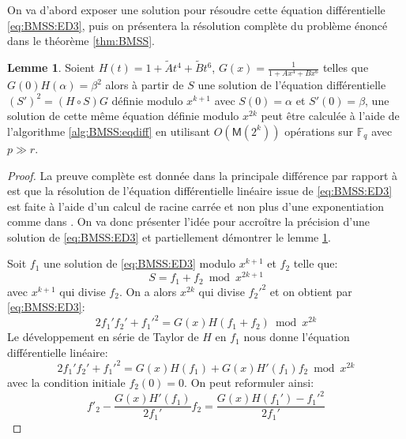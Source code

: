 \documentclass[10pt,a4paper]{book}
\theoremstyle{plain}
\theoremstyle{definition}
\newtheorem{lem}[thm]{Lemme}
\theoremstyle{definition}
\theoremstyle{definition}
\theoremstyle{definition}
\theoremstyle{remark}
\theoremstyle{remark}
\theoremstyle{definition}
\begin{document}
On va d'abord exposer une solution pour résoudre cette équation différentielle \eqref{eq:BMSS:ED3}, puis on présentera la résolution complète du problème énoncé dans le théorème \ref{thm:BMSS}. 

\begin{lem}
\label{lem:BMSS}
Soient $H(t)=1+\tilde{A}t^4+\tilde{B}t^6$, $G(x)=\frac{1}{1+Ax^4+Bx^6}$ telles que $G(0)H(\alpha)=\beta^2$ alors à partir de $S$ une solution de l'équation différentielle $(S')^2=(H \circ S) G$ définie modulo $x^{k+1}$ avec $S(0)=\alpha$ et $S'(0)=\beta$, une solution de cette même équation définie modulo $x^{2k}$ peut être calculée à l'aide de l'algorithme \ref{alg:BMSS:eqdiff} en utilisant $O(\mathsf{M}(2^k))$ opérations sur $\mathbb{F}_q$ avec $p \gg r$.
\end{lem}

\begin{proof}
La preuve complète est donnée dans \cite{Lercier-Sirvent2008} la principale différence par rapport à \cite{BMSS08} est que la résolution de l'équation différentielle linéaire issue de \eqref{eq:BMSS:ED3} est faite à l'aide d'un calcul de racine carrée et non plus d'une exponentiation comme dans \cite{BMSS08}. 
On va donc présenter l'idée pour accroître la précision d'une solution de \eqref{eq:BMSS:ED3} et partiellement démontrer le lemme \ref{lem:BMSS}.

Soit $f_1$ une solution de \eqref{eq:BMSS:ED3} modulo $x^{k+1}$ et $f_2$ telle que:
\begin{equation}
S=f_1+f_2 \bmod x^{2k+1}
\end{equation}
avec $x^{k+1}$ qui divise $f_2$. On a alors $x^{2k}$ qui divise $f_2'^2$ et on obtient par \eqref{eq:BMSS:ED3}:
\begin{equation}
\label{eq:BMSS:ED4}
2f_1'f_2'+f_1'^2=G(x)H(f_1+f_2) \bmod x^{2k}
\end{equation}
Le développement en série de Taylor de $H$ en $f_1$ nous donne l'équation différentielle linéaire:
\begin{equation}
2f_1'f_2'+f_1'^2=G(x)H(f_1)+G(x)H'(f_1)f_2 \bmod x^{2k}
\end{equation}
avec la condition initiale $f_2(0)=0$. On peut reformuler ainsi:
\begin{equation}
\label{eq:LS08:diflin}
f'_2-\frac{G(x)H'(f_1)}{2f_1'}f_2=\frac{G(x)H(f_1')-f_1'^2}{2f_1'}
\end{equation}


\end{proof}
\end{document}
